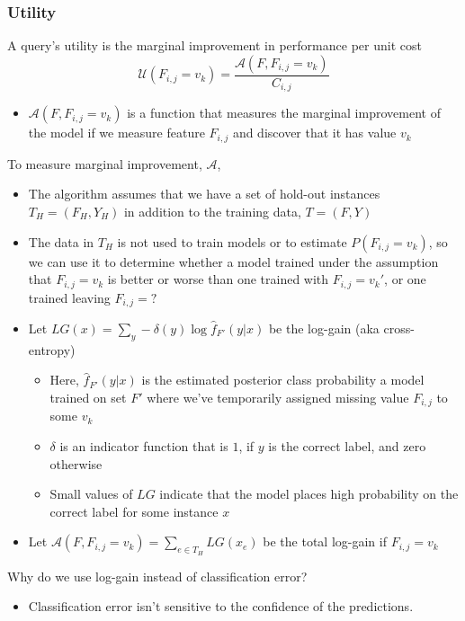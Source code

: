 \documentclass[10pt]{article}
\begin{document}
\subsubsection*{Utility}
A query's utility is the marginal improvement in performance per unit cost
\[\mathcal{U} (F_{i, j} = v_k) = \frac{\mathcal{A} (F, F_{i, j} = v_k)}{C_{i, j}}\]
\begin{itemize}
	\item $\mathcal{A}(F, F_{i, j} = v_k)$ is a function that measures the marginal improvement of the model if we measure feature $F_{i, j}$ and discover that it has value $v_k$
\end{itemize}
To measure marginal improvement, $\mathcal{A}$,
\begin{itemize}
	\item The algorithm assumes that we have a set of hold-out instances $T_H = (F_H, Y_H)$ in addition to the training data, $T = (F, Y)$
	\item The data in $T_H$ is not used to train models or to estimate $P(F_{i, j} = v_k)$, so we can use it to determine whether a model trained under the assumption that $F_{i, j} = v_k$ is better or worse than one trained with $F_{i, j} = v_k'$, or one trained leaving $F_{i, j} = ?$
	\item Let $LG(x) = \sum_y -\delta(y) \log \hat{f}_{F'}(y | x)$ be the log-gain (aka cross-entropy)
	\begin{itemize}
	    \item Here, $\hat{f}_{F'}(y | x)$ is the estimated posterior class probability a model trained on set $F'$ where we've temporarily assigned missing value $F_{i, j}$ to some $v_k$
	    \item $\delta$ is an indicator function that is $1$, if $y$ is the correct label, and zero otherwise
	    \item Small values of $LG$ indicate that the model places high probability on the correct label for some instance $x$
    \end{itemize}
    \item Let $\mathcal{A}(F, F_{i, j} = v_k) = \sum_{e \in T_H} LG(x_e)$ be the total log-gain if $F_{i, j} = v_k$
\end{itemize}
Why do we use log-gain instead of classification error?
\begin{itemize}
	\item Classification error isn't sensitive to the confidence of the predictions.
\end{itemize}
\end{document}

